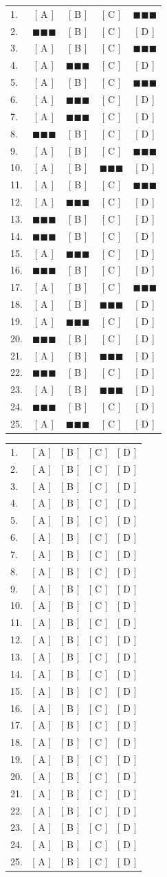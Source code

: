 \documentclass[9pt]{exam}
\def\a{& $\blacksquare\blacksquare\blacksquare$ & [ B ] & [ C ] & [ D ] \\}
\def\b{& [ A ] & $\blacksquare\blacksquare\blacksquare$ & [ C ] & [ D ] \\}
\def\c{& [ A ] & [ B ] & $\blacksquare\blacksquare\blacksquare$ & [ D ] \\}
\def\d{& [ A ] & [ B ] & [ C ] & $\blacksquare\blacksquare\blacksquare$ \\}
\begin{document}
\ifprintanswers
\begin{tabular}{lcccc}\\
  1. \d
  2. \a
  3. \d
  4. \b
  5. \d
  6. \b
  7. \b
  8. \a
  9. \d
  10. \c
  11. \d
  12. \b
  13. \a
  14. \a
  15. \b
  16. \a
  17. \d
  18. \c
  19. \b
  20. \a
  21. \c
  22. \a
  23. \c
  24. \a
  25. \b
\end{tabular}
\else
\begin{tabular}{lcccc}\\
  1. & [ A ] & [ B ] & [ C ] & [ D ] \\
  2. & [ A ] & [ B ] & [ C ] & [ D ] \\
  3. & [ A ] & [ B ] & [ C ] & [ D ] \\
  4. & [ A ] & [ B ] & [ C ] & [ D ] \\
  5. & [ A ] & [ B ] & [ C ] & [ D ] \\
  6. & [ A ] & [ B ] & [ C ] & [ D ] \\
  7. & [ A ] & [ B ] & [ C ] & [ D ] \\
  8. & [ A ] & [ B ] & [ C ] & [ D ] \\
  9. & [ A ] & [ B ] & [ C ] & [ D ] \\
  10. & [ A ] & [ B ] & [ C ] & [ D ] \\
  11. & [ A ] & [ B ] & [ C ] & [ D ] \\
  12. & [ A ] & [ B ] & [ C ] & [ D ] \\
  13. & [ A ] & [ B ] & [ C ] & [ D ] \\
  14. & [ A ] & [ B ] & [ C ] & [ D ] \\
  15. & [ A ] & [ B ] & [ C ] & [ D ] \\
  16. & [ A ] & [ B ] & [ C ] & [ D ] \\
  17. & [ A ] & [ B ] & [ C ] & [ D ] \\
  18. & [ A ] & [ B ] & [ C ] & [ D ] \\
  19. & [ A ] & [ B ] & [ C ] & [ D ] \\
  20. & [ A ] & [ B ] & [ C ] & [ D ] \\
  21. & [ A ] & [ B ] & [ C ] & [ D ] \\
  22. & [ A ] & [ B ] & [ C ] & [ D ] \\
  23. & [ A ] & [ B ] & [ C ] & [ D ] \\
  24. & [ A ] & [ B ] & [ C ] & [ D ] \\
  25. & [ A ] & [ B ] & [ C ] & [ D ] \\
\end{tabular}
\end{document}
